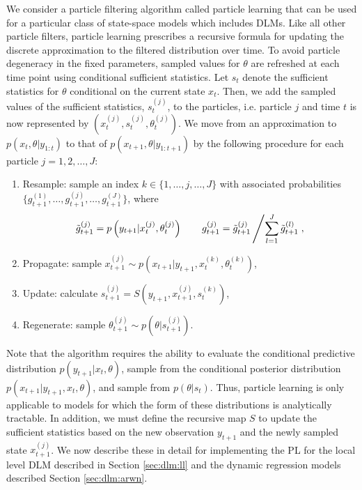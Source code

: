We consider a particle filtering algorithm called particle learning \citep{Carv:Joha:Lope:Pols:part} that can be used for a particular class of state-space models which includes DLMs. Like all other particle filters, particle learning prescribes a recursive formula for updating the discrete approximation to the filtered distribution over time. To avoid particle degeneracy in the fixed parameters, sampled values for $\theta$ are refreshed at each time point using conditional sufficient statistics. Let $s_t$ denote the sufficient statistics for $\theta$ conditional on the current state $x_t$. Then, we add the sampled values of the sufficient statistics, $s_t^{(j)}$, to the particles, i.e. particle $j$ and time $t$ is now represented by $\left(x_t^{(j)},s_t^{(j)},\theta_t^{(j)}\right)$. We move from an approximation to $p(x_t,\theta|y_{1:t})$ to that of $p(x_{t+1},\theta|y_{1:t+1})$ by the following procedure for each particle $j = 1,2,\ldots,J$:
\begin{enumerate}
\item Resample: sample an index $k \in \{1,\ldots,j,\ldots,J\}$ with associated probabilities $\{g_{t+1}^{(1)},\ldots,g_{t+1}^{(j)},\ldots,g_{t+1}^{(J)}\}$, where \[\tilde{g}_{t+1}^{(j)} = p\left(y_{t+1}|x_t^{(j)},\theta_t^{(j)}\right) \qquad g_{t+1}^{(j)} = \tilde{g}_{t+1}^{(j)} \left/ \sum_{l=1}^J \tilde{g}_{t+1}^{(l)}\right.,\]
\item Propagate: sample $x_{t+1}^{(j)} \sim p\left(x_{t+1}|y_{t+1},x_t^{(k)},\theta_t^{(k)}\right)$,
\item Update: calculate $s_{t+1}^{(j)} = S\left(y_{t+1},x_{t+1}^{(j)},s_t^{(k)}\right)$,
\item Regenerate: sample $\theta_{t+1}^{(j)} \sim p\left(\theta|s_{t+1}^{(j)}\right)$.
\end{enumerate}
Note that the algorithm requires the ability to evaluate the conditional predictive distribution $p(y_{t+1}|x_t,\theta)$, sample from the conditional posterior distribution $p(x_{t+1}|y_{t+1},x_t,\theta)$, and sample from $p(\theta|s_t)$. Thus, particle learning is only applicable to models for which the form of these distributions is analytically tractable. In addition, we must define the recursive map $S$ to update the sufficient statistics based on the new observation $y_{t+1}$ and the newly sampled state $x_{t+1}^{(j)}$. We now describe these in detail for implementing the PL for the local level DLM described in Section \ref{sec:dlm:ll} and the dynamic regression models described Section \ref{sec:dlm:arwn}.

